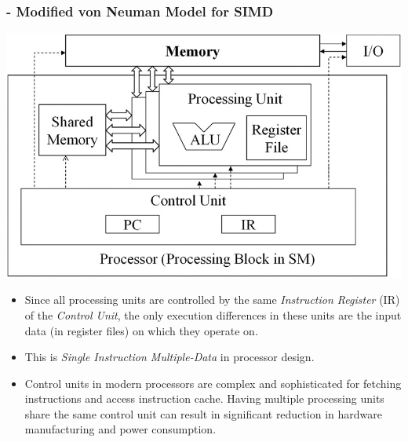 \subsubsection{- Modified von Neuman Model for SIMD}
\begin{center}
    \includegraphics[width=0.5\linewidth]{Images/CompArch/neuman_simd.png}
\end{center}
\begin{itemize}
    \item Since all processing units are controlled by the same \textsl{Instruction Register} (IR) of the \textsl{Control Unit}, the only execution differences in these units are the input data (in register files) on which they operate on.
    \item This is \textsl{Single Instruction Multiple-Data} in processor design.
    \item Control units in modern processors are complex and sophisticated for fetching instructions and access instruction cache. Having multiple processing units share the same control unit can result in significant reduction in hardware manufacturing and power consumption.
\end{itemize}

